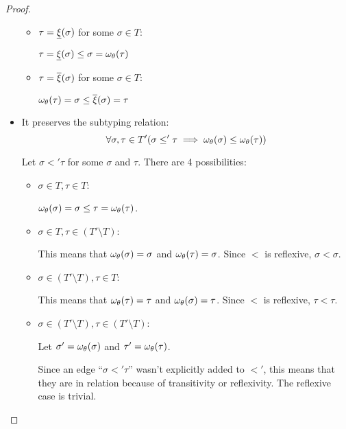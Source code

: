 \documentclass[main.tex]{subfiles}
\begin{document}
\begin{proof}
\begin{itemize}
\begin{itemize}
                \item $\tau = \underline{\xi}(\sigma)$ for some $\sigma \in T$:

                    $\tau = \underline{\xi}(\sigma) \leq \sigma = \omega_{\theta}(\tau)$

                \item $\tau = \overline{\xi}(\sigma)$ for some $\sigma \in T$:

                    $\omega_{\theta}(\tau) = \sigma \leq \overline{\xi}(\sigma) = \tau$
            \end{itemize}

        \item It preserves the subtyping relation:
            \[ \forall \sigma, \tau \in T' (\sigma \leq' \tau \implies
                \omega_{\theta}(\sigma) \leq \omega_{\theta}(\tau)) \]

            Let $\sigma \less' \tau$ for some $\sigma$ and $\tau$.
            There are 4 possibilities:
            \begin{itemize}
                \item $\sigma \in T, \tau \in T$:

                    $\omega_{\theta}(\sigma) = \sigma \leq \tau = \omega_{\theta}(\tau)$.
                \item $\sigma \in T, \tau \in (T' \setminus T)$:

                    This means that $\omega_{\theta}(\sigma) = \sigma$
                    and $\omega_{\theta}(\tau) = \sigma$. Since $\less$ is
                    reflexive, $\sigma \less \sigma$.
                \item $\sigma \in (T' \setminus T), \tau \in T$:

                    This means that $\omega_{\theta}(\tau) = \tau$
                    and $\omega_{\theta}(\sigma) = \tau$. Since $\less$ is
                    reflexive, $\tau \less \tau$.
                \item $\sigma \in (T' \setminus T), \tau \in (T' \setminus T)$:

                    Let $\sigma' = \omega_{\theta}(\sigma)$
                    and $\tau' = \omega_{\theta}(\tau)$.

                    Since an edge ``$\sigma \less' \tau$''
                    wasn't explicitly added to $\less'$, this means that they
                    are in relation because of transitivity or reflexivity.
                    The reflexive case is trivial.


\end{itemize}
\end{itemize}
\end{proof}
\end{document}
